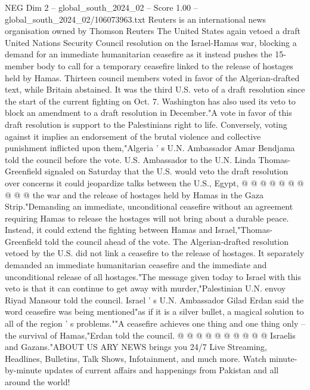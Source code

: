 \begin{textsample}{NEG Dim 2 – global\_south\_2024\_02 – Score 1.00 – global\_south\_2024\_02/106073963.txt}  \label{ex:f2_neg_253}
Reuters is an international news organisation owned by Thomson Reuters The United States again vetoed a draft United Nations Security Council resolution on the Israel-Hamas war, blocking a demand for an immediate humanitarian ceasefire as it instead pushes the 15-member body to call for a temporary ceasefire linked to the release of hostages held by Hamas.
Thirteen council members voted in favor of the Algerian-drafted text, while Britain abstained.
It was the third U.S. veto of a draft resolution since the start of the current fighting on Oct. 7.
Washington has also used its veto to block an amendment to a draft resolution in December."A vote in favor of this draft resolution is support to the Palestinians right to life.
Conversely, voting against it implies an endorsement of the brutal violence and collective punishment inflicted upon them,"Algeria ' s U.N.
Ambassador Amar Bendjama told the council before the vote.
U.S.
Ambassador to the U.N.
Linda Thomas-Greenfield signaled on Saturday that the U.S. would veto the draft resolution over concerns it could jeopardize talks between the U.S., Egypt, @ @ @ @ @ @ @ @ @ @ the war and the release of hostages held by Hamas in the Gaza Strip."Demanding an immediate, unconditional ceasefire without an agreement requiring Hamas to release the hostages will not bring about a durable peace.
Instead, it could extend the fighting between Hamas and Israel,"Thomas-Greenfield told the council ahead of the vote.
The Algerian-drafted resolution vetoed by the U.S. did not link a ceasefire to the release of hostages.
It separately demanded an immediate humanitarian ceasefire and the immediate and unconditional release of all hostages."The message given today to Israel with this veto is that it can continue to get away with murder,"Palestinian U.N. envoy Riyad Mansour told the council.
Israel ' s U.N.
Ambassador Gilad Erdan said the word ceasefire was being mentioned"as if it is a silver bullet, a magical solution to all of the region ' s problems.""A ceasefire achieves one thing and one thing only -- the survival of Hamas,"Erdan told the council. @ @ @ @ @ @ @ @ @ @ Israelis and Gazans."ABOUT US ARY NEWS brings you 24/7 Live Streaming, Headlines, Bulletins, Talk Shows, Infotainment, and much more.
Watch minute-by-minute updates of current affairs and happenings from Pakistan and all around the world!

\end{textsample}
